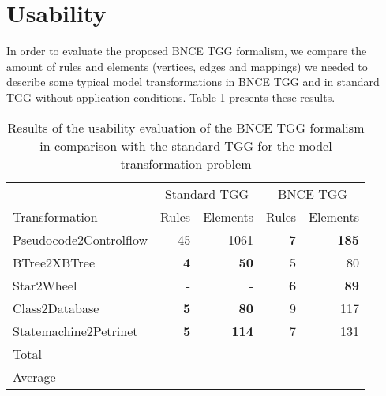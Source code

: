 
\section{Usability}
In order to evaluate the proposed BNCE TGG formalism, we compare the amount of rules and elements (vertices, edges and mappings) we needed to describe some typical model transformations in BNCE TGG and in standard TGG without application conditions. Table \ref{tab:formalism-eval} presents these results.
\begin{table}[h]
	\centering
	\begin{tabular}{l r r r r }
		\hline
						& \multicolumn{2}{c}{Standard TGG} & \multicolumn{2}{c}{BNCE TGG}\\
		Transformation 			& Rules & Elements 	& Rules & Elements\\
		\hline
		Pseudocode2Controlflow	& 45			& 1061	& \textbf{7}	& \textbf{185} \\
		BTree2XBTree			& \textbf{4}	& \textbf{50}	& 5		& 80 \\
		Star2Wheel				& -				& -		& \textbf{6} 	& \textbf{89} \\
		Class2Database			& \textbf{5}	& \textbf{80}	& 9 	& 117  \\
		Statemachine2Petrinet	& \textbf{5}	& \textbf{114}	& 7		& 131 \\
		
		\hline
		Total					&  & 		&	& \\
		Average					&  & 		&	& \\
		\hline
	\end{tabular}
	\caption{Results of the usability evaluation of the BNCE TGG formalism in comparison with the standard TGG for the model transformation problem}
	\label{tab:formalism-eval}
\end{table}

